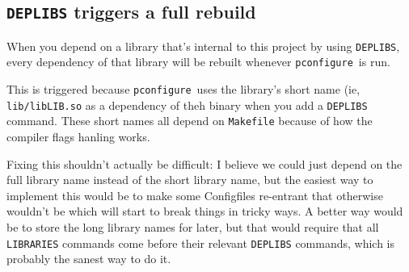\documentclass{article}
\newcommand{\pconfigure}{\texttt{pconfigure}}
\begin{document}
\subsection{\texttt{DEPLIBS} triggers a full rebuild}

When you depend on a library that's internal to this project by using
\texttt{DEPLIBS}, every dependency of that library will be rebuilt
whenever \pconfigure\ is run.

This is triggered because \pconfigure\ uses the library's short name
(ie, \texttt{lib/libLIB.so} as a dependency of theh binary when you
add a \texttt{DEPLIBS} command.  These short names all depend on
\texttt{Makefile} because of how the compiler flags hanling works.

Fixing this shouldn't actually be difficult: I believe we could just
depend on the full library name instead of the short library name, but
the easiest way to implement this would be to make some Configfiles
re-entrant that otherwise wouldn't be which will start to break things
in tricky ways.  A better way would be to store the long library names
for later, but that would require that all \texttt{LIBRARIES} commands
come before their relevant \texttt{DEPLIBS} commands, which is
probably the sanest way to do it.
\end{document}
